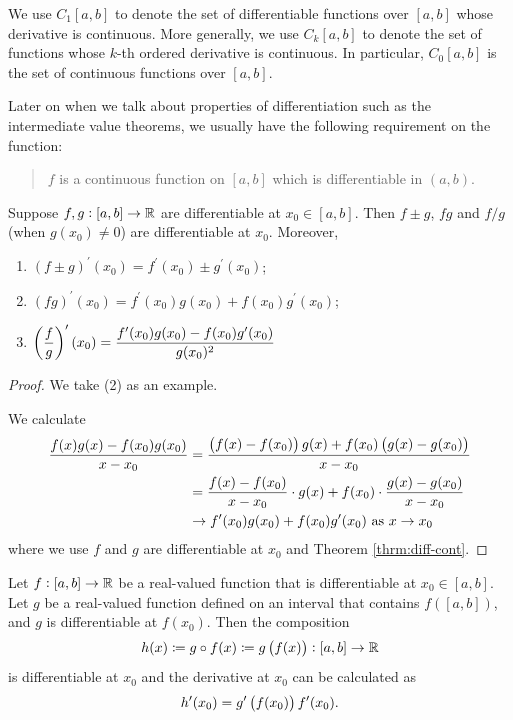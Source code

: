 \begin{notation}
We use $C_1[a,b]$ to denote the set of differentiable functions over $[a,b]$ whose derivative is continuous. More generally, we use $C_k[a,b]$ to denote the set of functions whose $k$-th ordered derivative is continuous. In particular, $C_0[a,b]$ is the set of continuous functions over $[a,b]$.
\end{notation}

Later on when we talk about properties of differentiation such as the intermediate value theorems, we usually have the following requirement on the function:
\begin{quote}
$f$ is a continuous function on $[a,b]$ which is differentiable in $(a,b)$.
\end{quote}

\begin{theorem}
Suppose $f,g:[a,b]\to\mathbb R$ are differentiable at $x_0\in[a,b]$. Then $f\pm g$, $fg$ and $f/g$ (when $g(x_0)\neq0$) are differentiable at $x_0$. Moreover,
\begin{enumerate}[label=(\arabic*)]
\item $(f\pm g)^\prime(x_0)=f^\prime(x_0)\pm g^\prime(x_0)$;
\item $(fg)^\prime(x_0)=f^\prime(x_0)g(x_0)+f(x_0)g^\prime(x_0)$;
\item $\displaystyle\left(\frac{f}{g}\right)^\prime(x_0)=\frac{f^\prime(x_0)g(x_0)-f(x_0)g^\prime(x_0)}{g(x_0)^2}$
\end{enumerate}
\end{theorem}

\begin{proof}
We take (2) as an example.

We calculate
\begin{align*}
\frac{f(x)g(x)-f(x_0)g(x_0)}{x-x_0}&=\frac{\left(f(x)-f(x_0)\right)g(x)+f(x_0)\left(g(x)-g(x_0)\right)}{x-x_0}\\
&=\frac{f(x)-f(x_0)}{x-x_0}\cdot g(x)+f(x_0)\cdot\frac{g(x)-g(x_0)}{x-x_0}\\
&\to f^\prime(x_0)g(x_0)+f(x_0)g^\prime(x_0)\text{ as }x\to x_0
\end{align*}
where we use $f$ and $g$ are differentiable at $x_0$ and Theorem \ref{thrm:diff-cont}.
\end{proof}

\begin{theorem}
Let $f:[a,b]\to\mathbb R$ be a real-valued function that is differentiable at $x_0\in[a,b]$. Let $g$ be a real-valued function defined on an interval that contains $f([a,b])$, and $g$ is differentiable at $f(x_0)$. Then the composition
\[ h(x)\coloneqq g\circ f(x)\coloneqq g\left(f(x)\right):[a,b]\to\mathbb R \]
is differentiable at $x_0$ and the derivative at $x_0$ can be calculated as
\[ h^\prime(x_0)=g^\prime\left(f(x_0)\right)f^\prime(x_0). \]
\end{theorem}

